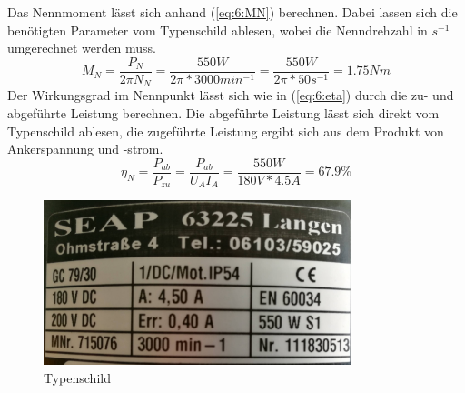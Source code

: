 \chapter{}

\section{}
Das Nennmoment lässt sich anhand (\ref{eq:6:MN}) berechnen. Dabei lassen sich die benötigten Parameter vom Typenschild ablesen, wobei die Nenndrehzahl in $ s^{-1} $ umgerechnet werden muss.
\begin{equation}
	M_{N} = \frac{P_{N}}{2\pi N_{N}} = \frac{550W}{2\pi*3000min^{-1}} = \frac{550W}{2\pi*50s^{-1}} = 1.75Nm
	\label{eq:6:MN}
\end{equation}
Der Wirkungsgrad im Nennpunkt lässt sich wie in (\ref{eq:6:eta}) durch die zu- und abgeführte Leistung berechnen. Die abgeführte Leistung lässt sich direkt vom Typenschild ablesen, die zugeführte Leistung ergibt sich aus dem Produkt von Ankerspannung und -strom.
\begin{equation}
	\eta_{N} = \frac{P_{ab}}{P_{zu}} = \frac{P_{ab}}{U_{A}I_{A}} = \frac{550W}{180V*4.5A} = 67.9\%
	\label{eq:6:eta}
\end{equation}

\begin{figure}[h]
	\centering
	\includegraphics[width=0.8\textwidth]{./bilder/typenschild.jpg}
	\caption{Typenschild}
	\label{fig:typenschild}
\end{figure}